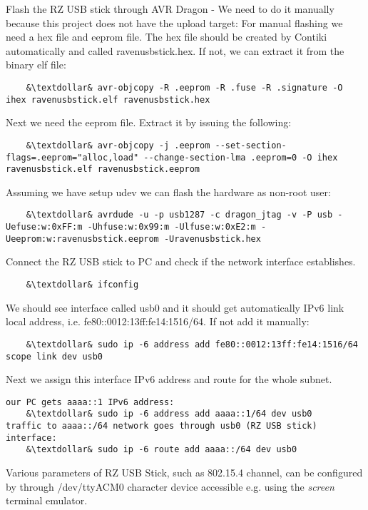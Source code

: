 \documentclass{article}
\begin{document}
Flash the RZ USB stick through AVR Dragon - We need to do it manually because this project does not have the upload target:
For manual flashing we need a hex file and eeprom file. The hex file should be created by Contiki automatically and called ravenusbstick.hex.
If not, we can extract it from the binary elf file:
\begin{lstlisting}
	&\textdollar& avr-objcopy -R .eeprom -R .fuse -R .signature -O ihex ravenusbstick.elf ravenusbstick.hex
\end{lstlisting}
Next we need the eeprom file. Extract it by issuing the following:
\begin{lstlisting}
	&\textdollar& avr-objcopy -j .eeprom --set-section-flags=.eeprom="alloc,load" --change-section-lma .eeprom=0 -O ihex ravenusbstick.elf ravenusbstick.eeprom
\end{lstlisting}
Assuming we have setup udev we can flash the hardware as non-root user: %
\begin{lstlisting}
	&\textdollar& avrdude -u -p usb1287 -c dragon_jtag -v -P usb -Uefuse:w:0xFF:m -Uhfuse:w:0x99:m -Ulfuse:w:0xE2:m -Ueeprom:w:ravenusbstick.eeprom -Uravenusbstick.hex
\end{lstlisting}

Connect the RZ USB stick to PC and check if the network interface establishes.
\begin{lstlisting}
	&\textdollar& ifconfig
\end{lstlisting}

We should see interface called usb0 and it should get automatically IPv6 link local address, i.e. fe80::0012:13ff:fe14:1516/64.
If not add it manually:
\begin{lstlisting}
	&\textdollar& sudo ip -6 address add fe80::0012:13ff:fe14:1516/64 scope link dev usb0
\end{lstlisting}
Next we assign this interface IPv6 address and route for the whole subnet.
\begin{lstlisting}
our PC gets aaaa::1 IPv6 address:
	&\textdollar& sudo ip -6 address add aaaa::1/64 dev usb0
traffic to aaaa::/64 network goes through usb0 (RZ USB stick) interface:
	&\textdollar& sudo ip -6 route add aaaa::/64 dev usb0
\end{lstlisting}
Various parameters of RZ USB Stick, such as 802.15.4 channel,
can be configured by through /dev/ttyACM0 character device
accessible e.g. using the {\it{screen}} terminal emulator.
\end{document}

